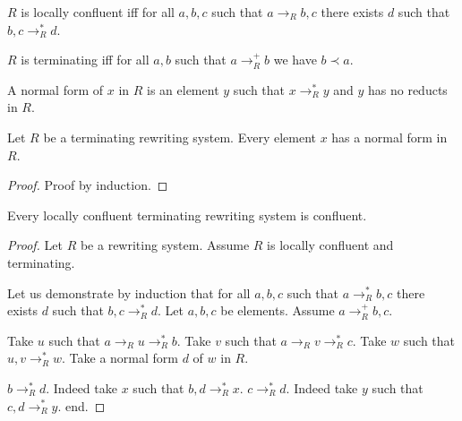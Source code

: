 \documentclass{article}
\newcommand{\reduces}[1]{\to_{#1}}
\newcommand{\reducesTC}[1]{\to_{#1}^{+}}
\newcommand{\reducesTCR}[1]{\to_{#1}^{*}}
\begin{document}
\begin{forthel}
    \begin{definition}
      $R$ is locally confluent iff for all $a, b, c$ such that
      $a \reduces{R} b, c$
      there exists $d$ such that $b, c \reducesTCR{R} d$.
    \end{definition}

    \begin{definition}[Terminating]
      $R$ is terminating iff
      for all $a, b$ such that $a \reducesTC{R} b$ we have $b \prec a$.
    \end{definition}

    \begin{definition}
      A normal form of $x$ in $R$ is an element $y$ such that
      $x \reducesTCR{R} y$ and $y$ has no reducts in $R$.
    \end{definition}

    \begin{lemma}
      Let $R$ be a terminating rewriting system.
      Every element $x$ has a normal form in $R$.
    \end{lemma}
    \begin{proof}
      Proof by induction.
    \end{proof}


    \begin{lemma}[Newman]
      Every locally confluent terminating rewriting system is confluent.
    \end{lemma}
    \begin{proof}
      Let $R$ be a rewriting system. Assume $R$ is locally confluent and
      terminating.

      Let us demonstrate by induction that for all $a,b,c$ such that $a \reducesTCR{R} b,c$ there exists $d$ such that $b,c \reducesTCR{R} d$.
        Let $a,b,c$ be elements. Assume $a \reducesTC{R} b,c$.

        Take $u$ such that $a \reduces{R} u \reducesTCR{R} b$.
        Take $v$ such that $a \reduces{R} v \reducesTCR{R} c$.
        Take $w$ such that $u,v \reducesTCR{R} w$.
        Take a normal form $d$ of $w$ in $R$.

        $b \reducesTCR{R} d$. Indeed take $x$ such that $b,d \reducesTCR{R} x$. $c \reducesTCR{R} d$. Indeed take $y$ such that $c,d \reducesTCR{R} y$.
      end.
    \end{proof}
  \end{forthel}
\end{document}
